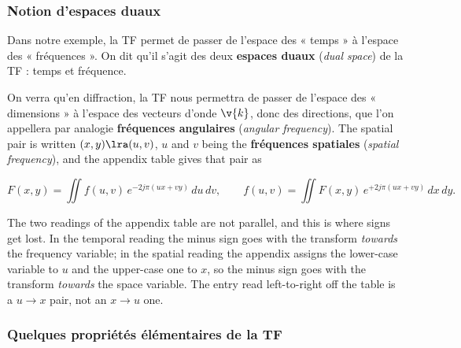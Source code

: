 \subsubsection{Notion d'espaces duaux}

\begin{definition}
  Dans notre exemple, la TF permet de passer de l'espace des « temps » à
  l'espace des « fréquences ». On dit qu'il s'agit des deux \textbf{espaces
  duaux} (\textit{dual space}) de la TF : temps et fréquence.
\end{definition}

On verra qu'en diffraction, la TF nous permettra de passer de l'espace des
« dimensions » à l'espace des vecteurs d'onde $\v{k}$, donc des directions, que
l'on appellera par analogie \textbf{fréquences angulaires} (\textit{angular
frequency}). The spatial pair is written $(x,y)\lra(u,v)$, $u$ and $v$ being the
\textbf{fréquences spatiales} (\textit{spatial frequency}), and the appendix
table gives that pair as

\[
  F(x,y)=\iint f(u,v)\,e^{-2j\pi(ux+vy)}\,du\,dv,
  \qquad
  f(u,v)=\iint F(x,y)\,e^{+2j\pi(ux+vy)}\,dx\,dy .
\]

\begin{remark}
  The two readings of the appendix table are not parallel, and this is where
  signs get lost. In the temporal reading the minus sign goes with the
  transform \emph{towards} the frequency variable; in the spatial reading the
  appendix assigns the lower-case variable to $u$ and the upper-case one to $x$,
  so the minus sign goes with the transform \emph{towards} the space variable.
  The entry read left-to-right off the table is a $u\to x$ pair, not an
  $x\to u$ one.
\end{remark}

\subsubsection{Quelques propriétés élémentaires de la TF}

